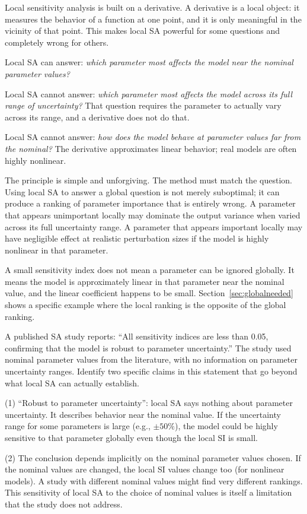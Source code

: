 Local sensitivity analysis is built on a derivative. A derivative
is a local object: it measures the behavior of a function at one point,
and it is only meaningful in the vicinity of that point.
This makes local SA powerful for some questions and completely wrong
for others.

Local SA can answer: \emph{which parameter most affects the model
near the nominal parameter values?}

Local SA cannot answer: \emph{which parameter most affects the model
across its full range of uncertainty?} That question requires the parameter
to actually vary across its range, and a derivative does not do that.

Local SA cannot answer: \emph{how does the model behave at parameter
values far from the nominal?} The derivative approximates linear behavior;
real models are often highly nonlinear.

The principle is simple and unforgiving. The method must match the question.
Using local SA to answer a global question is not merely suboptimal;
it can produce a ranking of parameter importance that is entirely wrong.
A parameter that appears unimportant locally may dominate the output
variance when varied across its full uncertainty range.
A parameter that appears important locally may have negligible effect
at realistic perturbation sizes if the model is highly nonlinear
in that parameter.

A small sensitivity index does not mean a parameter can be ignored globally.
It means the model is approximately linear in that parameter near the nominal
value, and the linear coefficient happens to be small.
Section~\ref{sec:globalneeded} shows a specific example where the local
ranking is the opposite of the global ranking.

\begin{selfcheck}
A published SA study reports: ``All sensitivity indices are less than 0.05,
confirming that the model is robust to parameter uncertainty.''
The study used nominal parameter values from the literature, with
no information on parameter uncertainty ranges.
Identify two specific claims in this statement that go beyond what
local SA can actually establish.
\end{selfcheck}
\begin{scAnswer}
(1) ``Robust to parameter uncertainty'': local SA says nothing about
parameter uncertainty. It describes behavior near the nominal value.
If the uncertainty range for some parameters is large (e.g., $\pm50\%$),
the model could be highly sensitive to that parameter globally even
though the local SI is small.

(2) The conclusion depends implicitly on the nominal parameter values
chosen. If the nominal values are changed, the local SI values change
too (for nonlinear models). A study with different nominal values
might find very different rankings. This sensitivity of local SA
to the choice of nominal values is itself a limitation that the study
does not address.
\end{scAnswer}


